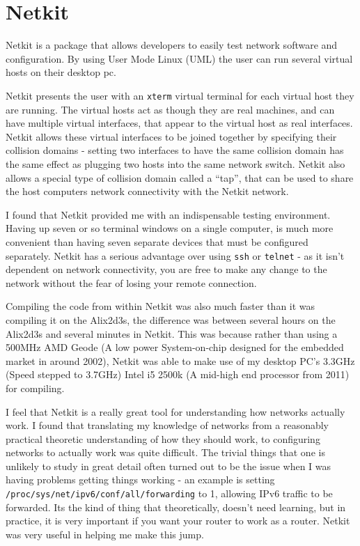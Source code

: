 \documentclass[12pt]{report}
\begin{document}
\section{Netkit} 
Netkit is a package that allows developers to easily test network
software and configuration. By using User Mode Linux (UML)
 the user can run several virtual hosts on
their desktop pc. 

Netkit presents the user with an \texttt{xterm} virtual terminal for each
virtual host they are running. The virtual hosts act as though they are real
machines, and can have multiple virtual interfaces, that appear to the virtual
host as real interfaces. Netkit allows these virtual interfaces to be joined
together by specifying their collision domains - setting two interfaces to have
the same collision domain has the same effect as plugging two hosts into the
same network switch. Netkit also allows a special type of collision domain
called a ``tap'', that can be used to share the host computers network
connectivity with the Netkit network.

I found that Netkit provided me with an indispensable testing environment.
Having up seven or so terminal windows on a single computer, is much more
convenient than having seven separate devices that must be configured
separately. Netkit has a serious advantage over using \texttt{ssh} or
\texttt{telnet} - as it isn't dependent on network connectivity, you are free
to make any change to the network without the fear of losing your remote
connection.   

Compiling the code from within Netkit was also much faster than it was
compiling it on the Alix2d3s, the difference was between several hours on the
Alix2d3s and several minutes in Netkit. This was because rather than using a
500MHz AMD Geode (A low power System-on-chip designed for the embedded market
in around 2002), Netkit was able to make use of my desktop PC's 3.3GHz (Speed
stepped to 3.7GHz) Intel i5 2500k (A mid-high end processor from 2011) for
compiling. 

I feel that Netkit is a really great tool for understanding how networks
actually work. I found that translating my knowledge of networks from a
reasonably practical theoretic understanding of how they should work, to
configuring networks to actually work was quite difficult. The trivial things
that one is unlikely to study in great detail often turned out to be the issue
when I was having problems getting things working - an example is setting
\texttt{/proc/sys/net/ipv6/conf/all/forwarding} to 1, allowing IPv6 traffic to
be forwarded. Its the kind of thing that theoretically,  doesn't need learning,
but in practice, it is very important if you want your router to work as a
router. Netkit was very useful in helping me make this jump. 
\end{document}
